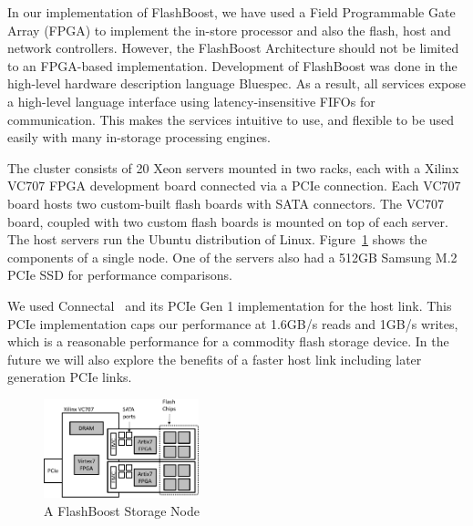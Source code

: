 
In our implementation of FlashBoost, we have used a Field Programmable Gate
Array (FPGA) to implement the in-store processor and also the flash, host and
network controllers. However, the FlashBoost Architecture should not be limited
to an FPGA-based implementation.  Development of FlashBoost was done in the
high-level hardware description language Bluespec. As a result, all services
expose a high-level language interface using latency-insensitive FIFOs for
communication. This makes the services intuitive to use, and flexible to be used
easily with many in-storage processing engines.

The cluster consists of 20 Xeon servers mounted in two racks, each with a Xilinx
VC707 FPGA development board connected via a PCIe connection. Each VC707 board
hosts two custom-built flash boards with SATA connectors. The VC707 board,
coupled with two custom flash boards is mounted on top of each server.
The host servers run the Ubuntu distribution of Linux.
Figure~\ref{fig:bluedbmnode} shows the components of a single node.
One of the servers also had a 512GB Samsung M.2 PCIe SSD for performance
comparisons.

We used Connectal~\cite{connectal} and its PCIe Gen 1 implementation for the
host link. This PCIe implementation caps our performance at 1.6GB/s reads and
1GB/s writes, which is a reasonable performance for a commodity flash storage
device. In the future we will also explore the benefits of a faster host link
including later generation PCIe links.

\begin{figure}[ht]
	\begin{center}
	\includegraphics[width=0.4\textwidth]{figures/storagenode-crop.pdf}
	\caption{A FlashBoost Storage Node}
	\label{fig:bluedbmnode}
	\end{center}
\end{figure}


